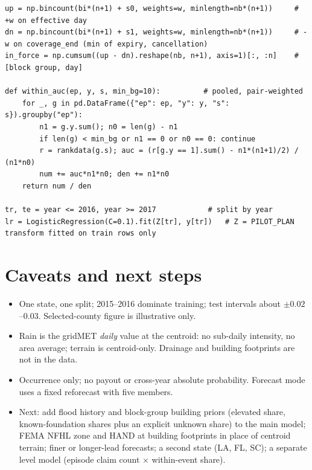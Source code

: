 \documentclass[11pt]{article}
\begin{document}
\begin{lstlisting}
up = np.bincount(bi*(n+1) + s0, weights=w, minlength=nb*(n+1))     # +w on effective day
dn = np.bincount(bi*(n+1) + s1, weights=w, minlength=nb*(n+1))     # -w on coverage_end (min of expiry, cancellation)
in_force = np.cumsum((up - dn).reshape(nb, n+1), axis=1)[:, :n]    # [block group, day]

def within_auc(ep, y, s, min_bg=10):          # pooled, pair-weighted
    for _, g in pd.DataFrame({"ep": ep, "y": y, "s": s}).groupby("ep"):
        n1 = g.y.sum(); n0 = len(g) - n1
        if len(g) < min_bg or n1 == 0 or n0 == 0: continue
        r = rankdata(g.s); auc = (r[g.y == 1].sum() - n1*(n1+1)/2) / (n1*n0)
        num += auc*n1*n0; den += n1*n0
    return num / den

tr, te = year <= 2016, year >= 2017            # split by year
lr = LogisticRegression(C=0.1).fit(Z[tr], y[tr])   # Z = PILOT_PLAN transform fitted on train rows only
\end{lstlisting}

\section{Caveats and next steps}

\begin{itemize}
  \item One state, one split; 2015--2016 dominate training; test intervals about $\pm0.02$--$0.03$. Selected-county figure is illustrative only.
  \item Rain is the gridMET \emph{daily} value at the centroid: no sub-daily intensity, no area average; terrain is centroid-only. Drainage and building footprints are not in the data.
  \item Occurrence only; no payout or cross-year absolute probability. Forecast mode uses a fixed reforecast with five members.
  \item Next: add flood history and block-group building priors (elevated share, known-foundation shares plus an explicit unknown share) to the main model; FEMA NFHL zone and HAND at building footprints in place of centroid terrain; finer or longer-lead forecasts; a second state (LA, FL, SC); a separate level model (episode claim count $\times$ within-event share).
\end{itemize}
\end{document}
